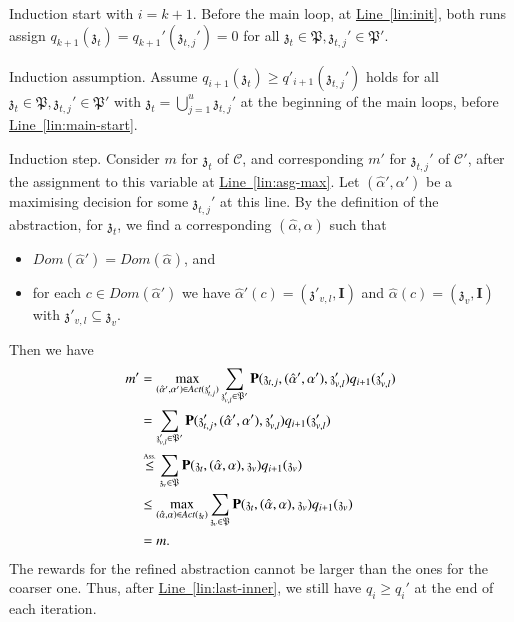 \documentclass[10pt,twocolumn]{article}
\newcommand{\acts}{\mathit{Act}}
\newcommand{\pmat}{\mathbf{P}}
\newcommand{\cmodel}{\mathcal{C}}
\newcommand{\act}{\alpha}
\newcommand{\apart}{\mathfrak{P}}
\newcommand{\astate}{\mathfrak{z}}
\newcommand{\prismCmd}{c}
\newcommand{\reflin}[1]{\texorpdfstring{\hyperref[lin:#1]{Line~\ref*{lin:#1}}}{Line~\ref*{lin:#1}}}
\newcommand{\dom}{\mathit{Dom}}
\begin{document}
Induction start with $i = k+1$. Before the main loop, at \reflin{init}, both runs assign $q_{k+1}(\astate_t) = q_{k+1}'(\astate_{t,j}') = 0$ for all $\astate_t \in \apart, \astate_{t,j}' \in \apart'$.

Induction assumption. Assume $q_{i+1}(\astate_t) \geq q'_{i+1}(\astate_{t,j}')$ holds
for all $\astate_t \in \apart, \astate_{t,j}' \in \apart'$ with $\astate_t = \bigcup_{j=1}^u \astate_{t,j}'$
at the beginning of the main loops, before \reflin{main-start}.

Induction step. Consider $m$ for $\astate_t$ of $\cmodel$, and corresponding $m'$ for $\astate_{t,j}'$ of $\cmodel'$, after the assignment to this variable at \reflin{asg-max}.
Let $(\hat{\act}', \act')$ be a maximising decision for some $\astate_{t,j}'$ at this line.
By the definition of the abstraction, for $\astate_t$, we find a corresponding $(\hat{\act}, \act)$ such that
\begin{itemize}
\item $\dom(\hat{\act}') = \dom(\hat{\act})$, and
\item for each $\prismCmd \in \dom(\hat{\act}')$ we have $\hat{\act}'(\prismCmd) = (\astate'_{v,l}, \mathbf{I})$ and $\hat{\act}(\prismCmd) = (\astate_{v}, \mathbf{I})$ with $\astate'_{v,l} \subseteq \astate_{v}$.
\end{itemize}
Then we have
\begin{equation*}
  \begin{split}
    m' & = \max_{(\hat{\act}', \act')\in\acts(\astate_{t,j}')} \sum_{\astate'_{v,l} \in \apart'} \pmat(\astate_{t,j},(\hat{\act}', \act'),\astate'_{v,l}) q_{i+1}(\astate'_{v,l}) \\
    & = \sum_{\astate'_{v,l} \in \apart'} \pmat(\astate_{t,j}',(\hat{\act}', \act'),\astate'_{v,l}) q_{i+1}(\astate'_{v,l}) \\
    & \stackrel{\mbox{\tiny Ass.}}{\leq} \sum_{\astate_v \in \apart} \pmat(\astate_t,(\hat{\act}, \act),\astate_v) q_{i+1}(\astate_v) \\
    & \leq \max_{(\hat{\act}, \act)\in\acts(\astate_t)} \sum_{\astate_v \in \apart} \pmat(\astate_t,(\hat{\act}, \act),\astate_v) q_{i+1}(\astate_v) \\
    & = m .
  \end{split}
\end{equation*}
The rewards for the refined abstraction cannot be larger than the ones for the coarser one.
Thus, after \reflin{last-inner}, we still have $q_i \geq q_i'$ at the end of each iteration.
\end{document}
